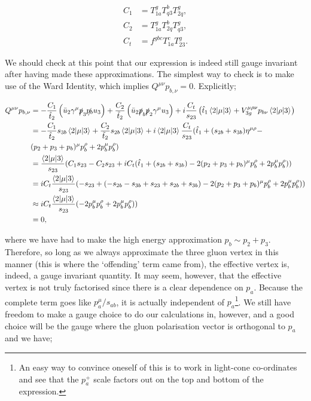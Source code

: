 \begin{subequations}
\begin{align}
C_1 &= T^g_{1a} T^b_{q3}T^g_{2q}, \\
C_2 &= T^g_{1a} T^b_{2q}T^g_{q3}, \\
C_t &= f^{gbc}T^c_{1a}T^g_{23}.
\end{align}
\end{subequations}

We should check at this point that our expression is indeed still gauge invariant after having made these approximations. The simplest way to check is to make use of the Ward Identity, which implies $Q^{\mu \nu} p_{b, \nu} = 0$. Explicitly; 

\begin{equation}
\begin{split}
Q^{\mu \nu}p_{b, \nu} &= -\frac{C_1}{\hat{t}_2} \left(\bar{u}_2 \gamma^\mu \slashed{p}_3 \slashed{p_b} u_3 \right) + \frac{C_2}{\tilde{t}_2} \left( \bar{u}_2 \slashed{p}_b \slashed{p}_2 \gamma^\mu u_3 \right) + i  \frac{C_t}{s_{23}} \left(\hat{t}_1  \mathinner{\langle2\vert\mu\vert3\rangle}_{} + V^{\mu \rho \nu}_{3g}p_{b \nu}  \mathinner{\langle2\vert\rho\vert3\rangle}_{} \right) \\
&= -\frac{C_1}{\hat{t}_2} s_{3b} \mathinner{\langle2\vert\mu\vert3\rangle}_{} + \frac{C_2}{\tilde{t}_2} s_{2b} \mathinner{\langle2\vert\mu\vert3\rangle}_{} + i \mathinner{\langle2\vert\mu\vert3\rangle}_{}\frac{C_t}{s_{23}}(\hat{t}_1 + (s_{2b} + s_{3b})\eta^{\mu \rho} - \\
&(p_2+p_3+p_b)^\mu p_b^\rho + 2p_b^\mu p_b^\rho) \\
&= \frac{\mathinner{\langle2\vert\mu\vert3\rangle}_{}}{s_{23}}(C_1 s_{23} - C_2 s_{23} + i C_t(\hat{t}_1 + (s_{2b} + s_{3b})-2(p_2+p_3+p_b)^\mu p_b^\rho + 2p_b^\mu p_b^\rho)) \\
&= i C_t \frac{\mathinner{\langle2\vert\mu\vert3\rangle}_{}}{s_{23}}(-s_{23} + (-s_{2b} - s_{3b} + s_{23} + s_{2b} + s_{3b})-2(p_2+p_3+p_b)^\mu p_b^\rho + 2p_b^\mu p_b^\rho)) \\
&\approx  i C_t \frac{\mathinner{\langle2\vert\mu\vert3\rangle}_{}}{s_{23}}(-2p_b^\mu p_b^\rho + 2p_b^\mu p_b^\rho)) \\
&= 0,
\end{split}
\end{equation}

where we have had to make the high energy approximation $p_b \sim p_2 + p_3$. Therefore, so long as we always approximate the three gluon vertex in this manner (this is where the `offending' term came from), the effective vertex is, indeed, a gauge invariant quantity. It may seem, however, that the effective vertex is not truly factorised since there is a clear dependence on $p_a$. Because the complete term goes like $p_a^\mu/s_{ab}$, it is actually independent of $p_a$\footnote{An easy way to convince oneself of this is to work in light-cone co-ordinates and see that the $p_a^+$ scale factors out on the top and bottom of the expression.}. We still have freedom to make a gauge choice to do our calculations in, however, and a good choice will be the gauge where the gluon polarisation vector is orthogonal to $p_a$ and we have;

